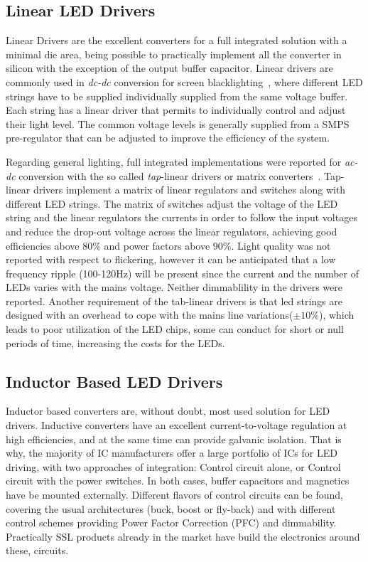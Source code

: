 \subsection{Linear LED Drivers}
Linear Drivers are the excellent converters for a full integrated solution with a minimal die area, being possible to practically implement all the converter in silicon with the exception of the output buffer capacitor. Linear drivers are commonly used in \emph{dc-dc} conversion for screen blacklighting~\cite{2007Sang-Yun,2008Tseng,2008Yuequan}, where different LED strings have to be supplied individually supplied from the same voltage buffer. Each string has a linear driver that permits to individually control and adjust their light level. The common voltage levels is generally supplied from a SMPS pre-regulator that can be adjusted to improve the efficiency of the system.

Regarding general lighting, full integrated implementations were reported for \emph{ac-dc} conversion with the so called \emph{tap}-linear drivers or matrix converters~\cite{2011Eunchul,2013Park,2014Chenyang}. Tap-linear drivers implement a matrix of linear regulators and switches along with different LED strings. The matrix of switches adjust the voltage of the LED string and the linear regulators the currents in order to follow the input voltages and reduce the drop-out voltage across the linear regulators, achieving good efficiencies above 80\% and power factors above 90\%. Light quality was not reported with respect to flickering, however it can be anticipated that a low frequency ripple (100-120Hz) will be present since the current and the number of LEDs varies with the mains voltage. Neither dimmablility in the drivers were reported. Another requirement of the tab-linear drivers is that led strings are designed with an overhead to cope with the mains line variations($\pm10\%$), which leads to poor utilization of the LED chips, some can conduct for short or null periods of time, increasing the costs for the LEDs.


\subsection{Inductor Based LED Drivers}

Inductor based converters are, without doubt, most used solution for LED drivers. Inductive converters have an excellent current-to-voltage regulation at high efficiencies, and at the same time can provide galvanic isolation. That is why, the majority of IC manufacturers offer a large portfolio of ICs for LED driving, with two approaches of integration: Control circuit alone, or Control circuit with the power switches. In both cases, buffer capacitors and magnetics have be mounted externally. Different flavors of control circuits can be found, covering the usual architectures (buck, boost or fly-back) and with different control schemes providing Power Factor Correction (PFC)  and dimmability. Practically SSL products already in the market have build the electronics around these, circuits.

